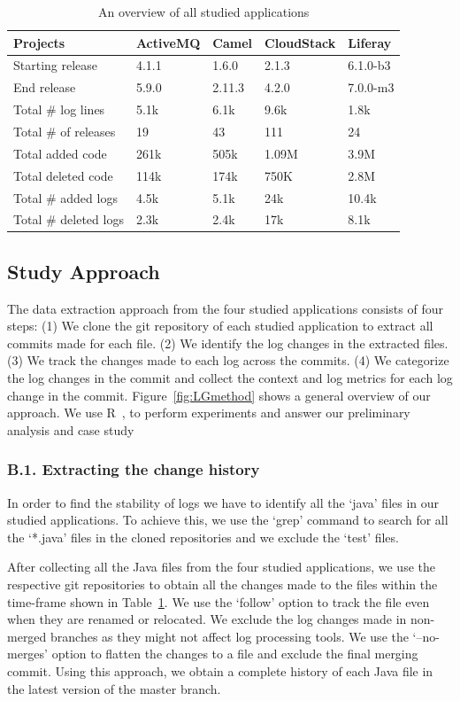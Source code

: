 \begin{table}[tb]
	\centering \protect\protect\caption{An overview of all studied applications}
	
	
	\label{tba:overviewsystems} %
	\begin{tabular}{lllll}
		\hline 
		Projects  & ActiveMQ  & Camel  & CloudStack  & Liferay \tabularnewline
		\hline 
		Starting release  & 4.1.1  & 1.6.0  & 2.1.3  & 6.1.0-b3 \tabularnewline
		End release  & 5.9.0  & 2.11.3  & 4.2.0  & 7.0.0-m3 \tabularnewline
		Total \# log lines  & 5.1k  & 6.1k  & 9.6k  & 1.8k \tabularnewline
		Total \# of releases  & 19  & 43  & 111  & 24 \tabularnewline
		Total added code  & 261k  & 505k  & 1.09M  & 3.9M \tabularnewline
		Total deleted code  & 114k  & 174k  & 750K  & 2.8M \tabularnewline
		Total \# added logs  & 4.5k  & 5.1k  & 24k  & 10.4k \tabularnewline
		Total \# deleted logs  & 2.3k  & 2.4k  & 17k  & 8.1k \tabularnewline
		\hline 
	\end{tabular}
\end{table}

\subsection{Study Approach}

The data extraction approach from the four studied applications consists of four steps: (1) We clone the git repository of each studied application to extract all commits made for each file. (2) We identify the log changes in the extracted files. (3) We track the changes made to each log across the commits. (4) We categorize the log changes in the commit and collect the context and log metrics for each log change in the commit.
Figure~\ref{fig:LGmethod} shows a general overview of our approach. We use R~\cite{ihaka1996r}, to perform experiments and answer our preliminary analysis and case study


\subsubsection*{B.1. Extracting the change history} 
In order to find the stability of logs we have to identify all the `java' files in our studied applications. To achieve this, we use the `grep' command to search for all the `*.java' files in the cloned repositories and we exclude the `test' files. 

After collecting all the Java files from the four studied applications, we use the respective git repositories to obtain all the changes made to the files within the time-frame shown in Table~\ref{tba:overviewsystems}. We use the `follow' option to track the file even when they are renamed or relocated. We exclude the log changes made in non-merged branches as they might not affect log processing tools. We use the `--no-merges' option to flatten the changes to a file and exclude the final merging commit. Using this approach, we obtain a complete history of each Java file in the latest version of the master branch.


